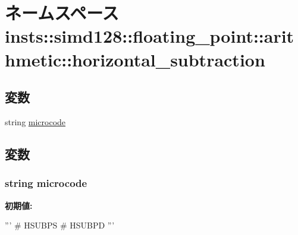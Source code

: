 \hypertarget{namespaceinsts_1_1simd128_1_1floating__point_1_1arithmetic_1_1horizontal__subtraction}{
\section{ネームスペース insts::simd128::floating\_\-point::arithmetic::horizontal\_\-subtraction}
\label{namespaceinsts_1_1simd128_1_1floating__point_1_1arithmetic_1_1horizontal__subtraction}
}
\subsection*{変数}
\begin{DoxyCompactItemize}
\item 
string \hyperlink{namespaceinsts_1_1simd128_1_1floating__point_1_1arithmetic_1_1horizontal__subtraction_a770f11a173e99389a8802f0107ed8f52}{microcode}
\end{DoxyCompactItemize}


\subsection{変数}
\hypertarget{namespaceinsts_1_1simd128_1_1floating__point_1_1arithmetic_1_1horizontal__subtraction_a770f11a173e99389a8802f0107ed8f52}{
\subsubsection[{microcode}]{\setlength{\rightskip}{0pt plus 5cm}string {\bf microcode}}}
\label{namespaceinsts_1_1simd128_1_1floating__point_1_1arithmetic_1_1horizontal__subtraction_a770f11a173e99389a8802f0107ed8f52}
{\bfseries 初期値:}
\begin{DoxyCode}
'''
# HSUBPS
# HSUBPD
'''
\end{DoxyCode}
